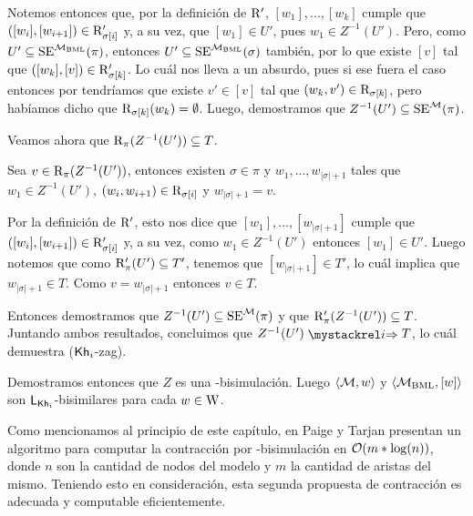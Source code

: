 \begin{demostracion}
\begin{itemize}
        Notemos entonces que, por la definición de $\mathrm{R}'$, $[w_1],...,[w_k]$ cumple que $([w_i],[w_{i+1}]) \in \mathrm{R}'_{\sigma[i]}$ y, a su vez, 
        que $[w_1] \in U'$, pues $w_1 \in Z^{-1}(U')$. Pero, como $U'\subseteq\mathrm{SE}^{\mathcal{M}_\mathrm{BML}}(\pi)$, entonces $U'\subseteq\mathrm{SE}^{\mathcal{M}_\mathrm{BML}}(\sigma)$ 
        también, por lo que existe $[v]$ tal que $([w_k],[v]) \in \mathrm{R}'_{\sigma[k]}$. 
        Lo cuál nos lleva a un absurdo, pues si ese fuera el caso entonces por  tendríamos que existe 
        $v' \in [v]$ tal que $(w_k,v') \in \mathrm{R}_{\sigma[k]}$, pero habíamos dicho que $\mathrm{R}_{\sigma[k]}(w_k) = \emptyset$.
        Luego, demostramos que $Z^{-1}(U')\subseteq\mathrm{SE}^{\mathcal{M}}(\pi)$.

        Veamos ahora que $\mathrm{R}_\pi(Z^{-1}(U')) \subseteq T$.

        Sea $v \in \mathrm{R}_\pi(Z^{-1}(U'))$, entonces existen $\sigma \in \pi$ y $w_1,...,w_{|\sigma|+1}$ tales que 
        $w_1 \in Z^{-1}(U')$, $(w_i,w_{i+1}) \in \mathrm{R}_{\sigma[i]}$ y $w_{|\sigma|+1} = v$. 

        Por la definición de $\mathrm{R}'$, esto nos dice que $[w_1],...,[w_{|\sigma|+1}]$ cumple que $([w_i],[w_{i+1}]) \in \mathrm{R}'_{\sigma[i]}$ 
        y, a su vez, como $w_1 \in Z^{-1}(U')$ entonces $[w_1] \in U'$. Luego notemos que como $\mathrm{R}'_\pi(U') \subseteq T'$, tenemos que 
        $[w_{|\sigma|+1}] \in T'$, lo cuál implica que $w_{|\sigma|+1} \in T$. Como $v = w_{|\sigma|+1}$ entonces $v \in T$. 

        Entonces demostramos que $Z^{-1}(U')\subseteq\mathrm{SE}^{\mathcal{M}}(\pi)$ y que $\mathrm{R}'_\pi(Z^{-1}(U')) \subseteq T$. 
        Juntando ambos resultados, concluimos que $Z^{-1}(U') \ultsExecAgi T$, lo cuál demuestra ($\mathsf{Kh}_i$-zag).
    \end{itemize}
    Demostramos entonces que $Z$ es una \KHilogic-bisimulación. Luego $\langle \mathcal{M},w \rangle$ y $\langle \mathcal{M}_\mathrm{BML},[w] \rangle$ son $\mathsf{L}_{\mathsf{Kh}_i}$-bisimilares 
    para cada $w \in \mathrm{W}$.
\end{demostracion}

Como mencionamos al principio de este capítulo, en \cite{Paige&TarjanContraction} 
Paige y Tarjan presentan un algoritmo para computar la contracción por \bml-bisimulación en $\mathcal{O}(m*\log(n))$, donde $n$ son la cantidad 
de nodos del modelo y $m$ la cantidad de aristas del mismo. Teniendo esto en 
consideración, esta segunda propuesta de contracción es adecuada y computable eficientemente.


